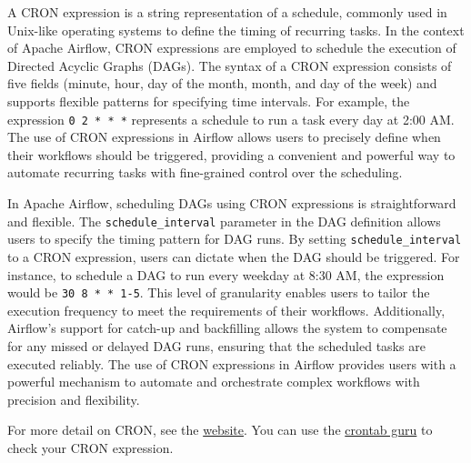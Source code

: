 A CRON expression is a string representation of a schedule, commonly used in Unix-like operating systems to define the timing of recurring tasks. In the context of Apache Airflow, CRON expressions are employed to schedule the execution of Directed Acyclic Graphs (DAGs). The syntax of a CRON expression consists of five fields (minute, hour, day of the month, month, and day of the week) and supports flexible patterns for specifying time intervals. For example, the expression \verb|0 2 * * *| represents a schedule to run a task every day at 2:00 AM. The use of CRON expressions in Airflow allows users to precisely define when their workflows should be triggered, providing a convenient and powerful way to automate recurring tasks with fine-grained control over the scheduling.

In Apache Airflow, scheduling DAGs using CRON expressions is straightforward and flexible. The \verb|schedule_interval| parameter in the DAG definition allows users to specify the timing pattern for DAG runs. By setting \verb|schedule_interval| to a CRON expression, users can dictate when the DAG should be triggered. For instance, to schedule a DAG to run every weekday at 8:30 AM, the expression would be \verb|30 8 * * 1-5|. This level of granularity enables users to tailor the execution frequency to meet the requirements of their workflows. Additionally, Airflow's support for catch-up and backfilling allows the system to compensate for any missed or delayed DAG runs, ensuring that the scheduled tasks are executed reliably. The use of CRON expressions in Airflow provides users with a powerful mechanism to automate and orchestrate complex workflows with precision and flexibility.

\begin{outline}
  For more detail on CRON, see the \href{https://docs.oracle.com/cd/E12058_01/doc/doc.1014/e12030/cron_expressions.htm}{website}. You can use the \href{https://crontab.guru/}{crontab guru} to check your CRON expression.
\end{outline}
